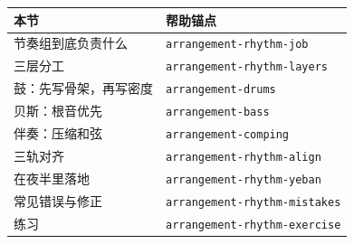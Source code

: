 \begin{helpmapping}
\begin{longtable}{p{}p{}}
\toprule
本节 & 帮助锚点 \\
\midrule
节奏组到底负责什么 & \texttt{arrangement-rhythm-job} \\
三层分工 & \texttt{arrangement-rhythm-layers} \\
鼓：先写骨架，再写密度 & \texttt{arrangement-drums} \\
贝斯：根音优先 & \texttt{arrangement-bass} \\
伴奏：压缩和弦 & \texttt{arrangement-comping} \\
三轨对齐 & \texttt{arrangement-rhythm-align} \\
在夜半里落地 & \texttt{arrangement-rhythm-yeban} \\
常见错误与修正 & \texttt{arrangement-rhythm-mistakes} \\
练习 & \texttt{arrangement-rhythm-exercise} \\
\bottomrule
\end{longtable}
\end{helpmapping}
